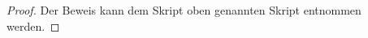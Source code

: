 \documentclass[12pt,titlepage,twoside,cleardoublepage]{article}
\theoremstyle{nummermitklammern}
\numberwithin{equation}{section}
\begin{document}
\begin{proof}
Der Beweis kann dem Skript oben genannten Skript entnommen werden.

\end{proof}
\end{document}

